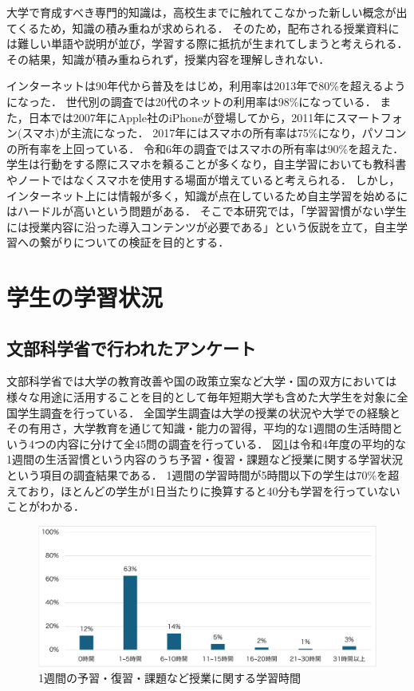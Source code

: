 \documentclass[12pt,a4j,titlepage]{ltjsarticle}
\begin{document}
大学で育成すべき専門的知識は，高校生までに触れてこなかった新しい概念が出てくるため，知識の積み重ねが求められる．
そのため，配布される授業資料には難しい単語や説明が並び，学習する際に抵抗が生まれてしまうと考えられる．
その結果，知識が積み重ねられず，授業内容を理解しきれない．

インターネットは90年代から普及をはじめ，利用率は2013年で80\%を超えるようになった．
世代別の調査では20代のネットの利用率は98\%になっている\cite{somu2024}．
また，日本では2007年にApple社のiPhoneが登場してから，2011年にスマートフォン(スマホ)が主流になった\cite{somu2019}．
2017年にはスマホの所有率は75\%になり，パソコンの所有率を上回っている．
令和6年の調査ではスマホの所有率は90\%を超えた\cite{somu2024}．
学生は行動をする際にスマホを頼ることが多くなり，自主学習においても教科書やノートではなくスマホを使用する場面が増えていると考えられる．
しかし，インターネット上には情報が多く，知識が点在しているため自主学習を始めるにはハードルが高いという問題がある．
そこで本研究では，「学習習慣がない学生には授業内容に沿った導入コンテンツが必要である」という仮説を立て，自主学習への繋がりについての検証を目的とする．

\clearpage

\section{学生の学習状況}

\subsection{文部科学省で行われたアンケート}
文部科学省では大学の教育改善や国の政策立案など大学・国の双方においては様々な用途に活用することを目的として毎年短期大学も含めた大学生を対象に全国学生調査を行っている\cite{monka2023}．
全国学生調査は大学の授業の状況や大学での経験とその有用さ，大学教育を通じて知識・能力の習得，平均的な1週間の生活時間という4つの内容に分けて全45問の調査を行っている．
図\ref{fig:tyousa}は令和4年度の平均的な1週間の生活習慣という内容のうち予習・復習・課題など授業に関する学習状況という項目の調査結果である．
1週間の学習時間が5時間以下の学生は70\%を超えており，ほとんどの学生が1日当たりに換算すると40分も学習を行っていないことがわかる．

\begin{figure}[!htb]
  \centering
  \includegraphics[width=15cm]{全国学生調査.pdf}
  \caption{1週間の予習・復習・課題など授業に関する学習時間}
  \label{fig:tyousa}
\end{figure}
\end{document}
